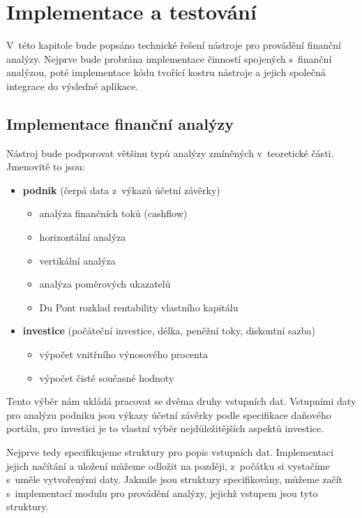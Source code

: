 \chapter{Implementace a testování}

V~této kapitole bude popsáno technické řešení nástroje pro provádění finanční analýzy. Nejprve bude probrána implementace činností spojených s~finanční analýzou, poté implementace kódu tvořící kostru nástroje a jejich společná integrace do výsledné aplikace.

\section{Implementace finanční analýzy}
Nástroj bude podporovat většinu typů analýzy zmíněných v~teoretické části. Jmenovitě to jsou: 

\begin{itemize}
  \item \textbf{podnik} (čerpá data z~výkazů účetní závěrky)
  \begin{itemize}
    \item analýza finančních toků (cashflow)
    \item horizontální analýza
    \item vertikální analýza
    \item analýza poměrových ukazatelů
    \item Du Pont rozklad rentability vlastního kapitálu 
  \end{itemize}
  \item \textbf{investice} (počáteční investice, délka, peněžní toky, diskontní sazba)
  \begin{itemize}
    \item výpočet vnitřního výnosového procenta
    \item výpočet čisté současné hodnoty
  \end{itemize}
\end{itemize}

Tento výběr nám ukládá pracovat se dvěma druhy vstupních dat. Vstupními daty pro analýzu podniku jsou výkazy účetní závěrky podle specifikace daňového portálu, pro investici je to vlastní výběr nejdůležitějších aspektů investice. 

Nejprve tedy specifikujeme struktury pro popis vstupních dat. Implementaci jejich načítání a uložení můžeme odložit na později, z~počátku si vystačíme s~uměle vytvořenými daty. Jakmile jsou struktury specifikovány, můžeme začít s~implementací modulu pro provádění analýzy, jejichž vstupem jsou tyto struktury.

